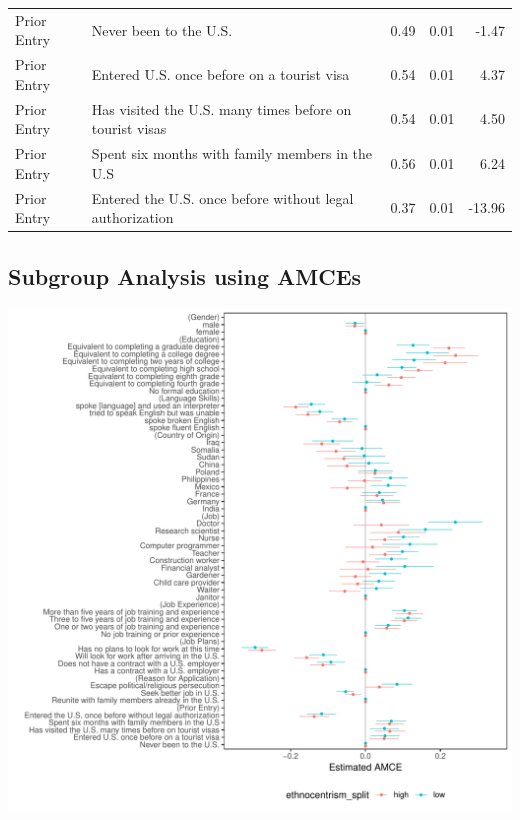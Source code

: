 \documentclass[a4paper,12pt]{article}\usepackage[]{graphicx}\usepackage[]{color}
\makeatletter
\def\maxwidth{ %
  \ifdim\Gin@nat@width>\linewidth
    \linewidth
  \else
    \Gin@nat@width
  \fi
}
\newenvironment{knitrout}{}{} %
\makeatother
\begin{document}
\begin{table}[ht]
\begin{tabular}{lp{3in}rrr}
  Prior Entry & Never been to the U.S. & 0.49 & 0.01 & -1.47 \\ 
  Prior Entry & Entered U.S. once before on a tourist visa & 0.54 & 0.01 & 4.37 \\ 
  Prior Entry & Has visited the U.S. many times before on tourist visas & 0.54 & 0.01 & 4.50 \\ 
  Prior Entry & Spent six months with family members in the U.S & 0.56 & 0.01 & 6.24 \\ 
  Prior Entry & Entered the U.S. once before without legal authorization & 0.37 & 0.01 & -13.96 \\ 
   \hline
\end{tabular}
\endgroup
\end{table}


\clearpage

\subsection{Subgroup Analysis using AMCEs}

\begin{knitrout}
\color{fgcolor}
\includegraphics[width=\maxwidth]{figure/hainmueller_immigration_subgroup_amce_appendix-1} 

\end{knitrout}
\end{document}
